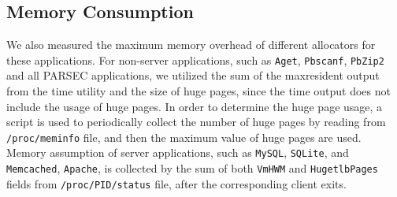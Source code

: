 

\subsection{Memory Consumption}
\label{sec:memory}

We also measured the maximum memory overhead of different allocators for these applications. For non-server applications, such as \texttt{Aget}, \texttt{Pbscanf}, \texttt{PbZip2} and all PARSEC applications, we utilized the sum of the maxresident output from the time utility and the size of huge pages, since the time output does not include the usage of huge pages. In order to determine the huge page usage, a script is used to periodically collect the number of huge pages by reading from \texttt{/proc/meminfo} file, and then the maximum value of huge pages are used. Memory assumption of server applications, such as \texttt{MySQL}, \texttt{SQLite}, and \texttt{Memcached}, \texttt{Apache}, is collected by the sum of both \texttt{VmHWM} and \texttt{HugetlbPages} fields from \texttt{/proc/PID/status} file, after the corresponding client exits. 

